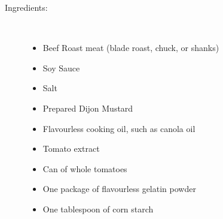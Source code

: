 \documentclass[11pt,letterpaper]{article}
\begin{document}
\begin{description}

\item[Ingredients:]\ \\
	\begin{itemize}
	\item Beef Roast meat (blade roast, chuck, or shanks)
	\item Soy Sauce
	\item Salt
	\item Prepared Dijon Mustard
	\item Flavourless cooking oil, such as canola oil
	\item Tomato extract
	\item Can  of whole tomatoes
	\item One package of flavourless gelatin powder
	\item One tablespoon of corn starch
	\end{itemize}


\end{description}
\end{document}
